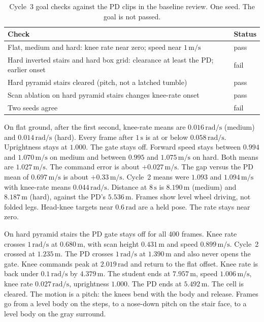 \documentclass[11pt]{article}
\begin{document}
\begin{table}[ht]
  \centering
  \caption{Cycle~3 goal checks against the PD clips in the baseline review.
    One seed. The goal is not passed.}
  \label{tab:goal-checks}
  \begin{tabular}{ll}
    \toprule
    Check & Status \\
    \midrule
    Flat, medium and hard: knee rate near zero; speed near \(1\,\mathrm{m/s}\) & pass \\
    Hard inverted stairs and hard box grid: clearance at least the PD; earlier onset & fail \\
    Hard pyramid stairs cleared (pitch, not a latched tumble) & pass \\
    Scan ablation on hard pyramid stairs changes knee-rate onset & pass \\
    Two seeds agree & fail \\
    \bottomrule
  \end{tabular}
\end{table}

On flat ground, after the first second, knee-rate means are \(0.016\,\mathrm{rad/s}\) (medium) and \(0.014\,\mathrm{rad/s}\) (hard).
Every frame after \(1\,\mathrm{s}\) is at or below \(0.058\,\mathrm{rad/s}\).
Uprightness stays at \(1.000\).
The gate stays off.
Forward speed stays between \(0.994\) and \(1.070\,\mathrm{m/s}\) on medium and between \(0.995\) and \(1.075\,\mathrm{m/s}\) on hard.
Both means are \(1.027\,\mathrm{m/s}\).
The command error is about \(+0.027\,\mathrm{m/s}\).
The gap versus the PD mean of \(0.697\,\mathrm{m/s}\) is about \(+0.33\,\mathrm{m/s}\).
Cycle~2 means were \(1.093\) and \(1.094\,\mathrm{m/s}\) with knee-rate means \(0.044\,\mathrm{rad/s}\).
Distance at \(8\,\mathrm{s}\) is \(8.190\,\mathrm{m}\) (medium) and \(8.187\,\mathrm{m}\) (hard), against the PD's \(5.536\,\mathrm{m}\).
Frames show level wheel driving, not folded legs.
Head-knee targets near \(0.6\,\mathrm{rad}\) are a held pose. The rate stays near zero.

On hard pyramid stairs the PD gate stays off for all 400 frames.
Knee rate crosses \(1\,\mathrm{rad/s}\) at \(0.680\,\mathrm{m}\), with scan height \(0.431\,\mathrm{m}\) and speed \(0.899\,\mathrm{m/s}\).
Cycle~2 crossed at \(1.235\,\mathrm{m}\).
The PD crosses \(1\,\mathrm{rad/s}\) at \(1.390\,\mathrm{m}\) and also never opens the gate.
Knee commands peak at \(2.019\,\mathrm{rad}\) and return to the flat offset.
Knee rate is back under \(0.1\,\mathrm{rad/s}\) by \(4.379\,\mathrm{m}\).
The student ends at \(7.957\,\mathrm{m}\), speed \(1.006\,\mathrm{m/s}\), knee rate \(0.027\,\mathrm{rad/s}\), uprightness \(1.000\).
The PD ends at \(5.492\,\mathrm{m}\).
The cell is cleared.
The motion is a pitch: the knees bend with the body and release.
Frames go from a level body on the steps, to a nose-down pitch on the stair face, to a level body on the gray surround.
\end{document}
